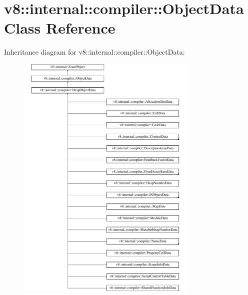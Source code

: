 \hypertarget{classv8_1_1internal_1_1compiler_1_1ObjectData}{}\section{v8\+:\+:internal\+:\+:compiler\+:\+:Object\+Data Class Reference}
\label{classv8_1_1internal_1_1compiler_1_1ObjectData}
Inheritance diagram for v8\+:\+:internal\+:\+:compiler\+:\+:Object\+Data\+:\begin{figure}[H]
\begin{center}
\leavevmode
\includegraphics[height=12.000000cm]{classv8_1_1internal_1_1compiler_1_1ObjectData}
\end{center}
\end{figure}

